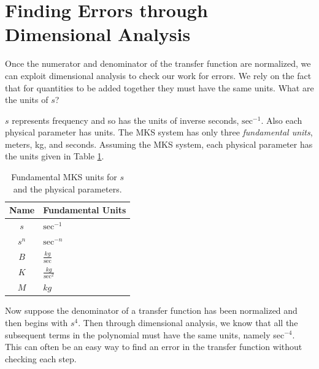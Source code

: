 \section{Finding Errors through Dimensional Analysis}

Once the numerator and denominator of the transfer function are normalized, we can exploit dimensional analysis to check our work for errors.   We rely on the fact that for quantities to be added together they must have the same units.  What are the units of $s$?

$s$ represents frequency and so has the units of inverse seconds, $\mathrm{sec}^{-1}$.  Also each physical parameter has units.  The MKS system has only three {\it fundamental units}, meters, kg, and seconds. Assuming the MKS system, each physical parameter has the units given in Table \ref{unitstable}.

\begin{table}[h]\centering
\renewcommand{\arraystretch}{1.5} %
\begin{tabular}{c|l}
Name	& Fundamental Units \\ \hline
$s$	& $\mathrm{sec}^{-1}$ 	\\
$s^n$   & $\mathrm{sec}^{-n}$     \\
$B$	& $\frac{kg}{\mathrm{sec}}$  \\
$K$	& $\frac{kg}{\mathrm{sec}^2}$   \\
$M$	& $kg$ \\
\end{tabular}
\caption{Fundamental MKS units for $s$ and the physical parameters.}\label{unitstable}
\end{table}

Now suppose the denominator of a transfer function has been normalized and then begins with $s^4$.   Then through dimensional analysis, we know that all the subsequent terms in the polynomial must have the same units, namely sec$^{-4}$.  This can often be an easy way to find an error in the transfer function without checking each step.

